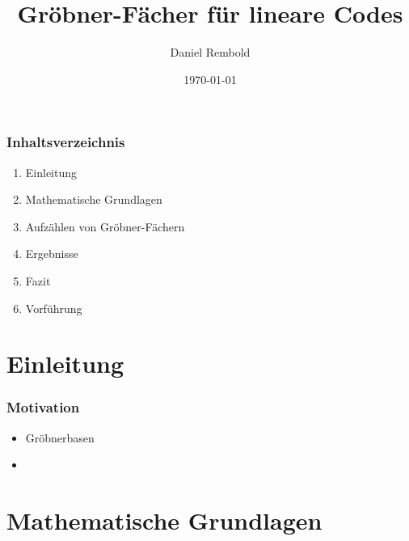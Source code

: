 \documentclass{beamer}
\title[Gröbner-Fächer für lineare Codes]{Gröbner-Fächer für lineare Codes}
\author{Daniel Rembold}
\institute[TUHH]
{
Technische Universit{\"a}t Hamburg Harburg \\
\medskip
{\emph{daniel.rembold@tuhh.de}}
}
\date{\today}
\begin{document}
%
\begin{frame}
\titlepage
\end{frame}
%

\begin{frame}
\frametitle{Inhaltsverzeichnis}

\begin{enumerate}
			\item Einleitung \\

	      	\item Mathematische Grundlagen \\
	      	
	      	\item Aufzählen von Gröbner-Fächern  \\ 
	      		
	      	\item Ergebnisse  \\ 
	  
	      	\item Fazit \\

		    \item Vorführung
\end{enumerate}

\end{frame}

\section{Einleitung}

\begin{frame}
\frametitle{Motivation}

\begin{itemize}
\item
Gröbnerbasen 

\item



\end{itemize}






\end{frame}


\section{Mathematische Grundlagen}
\end{document}

